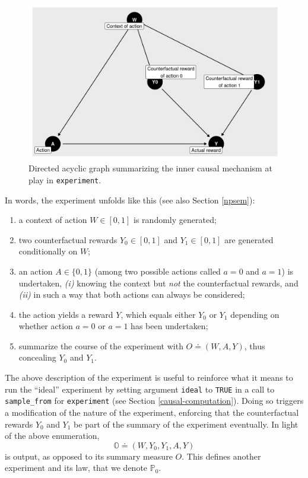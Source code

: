 \documentclass[
  11pt,
  openright,twoside]{book}
\newcommand{\bbO}{\mathbb{O}}
\newcommand{\bbP}{\mathbb{P}}
\newcommand{\defq}{\doteq}
\theoremstyle{definition}
\theoremstyle{definition}
\theoremstyle{definition}
\theoremstyle{definition}
\theoremstyle{remark}
\begin{document}
\begin{figure}

{\centering \includegraphics[width=0.7\linewidth]{img/DAG-1} 

}

\caption{Directed acyclic graph summarizing the inner causal mechanism at play in \texttt{experiment}.}\label{fig:DAG}
\end{figure}

In words, the experiment unfolds like this (see also Section \ref{npsem}):

\begin{enumerate}
\def\labelenumi{\arabic{enumi}.}
\item
  a context of action \(W \in [0,1]\) is randomly generated;
\item
  two counterfactual rewards \(Y_{0}\in [0,1]\) and \(Y_{1}\in [0,1]\) are
  generated conditionally on \(W\);
\item
  an action \(A \in \{0,1\}\) (among two possible actions called \(a=0\) and
  \(a=1\)) is undertaken, \emph{(i)} knowing the context but \emph{not} the
  counterfactual rewards, and \emph{(ii)} in such a way that both actions can
  always be considered;
\item
  the action yields a reward \(Y\), which equals either \(Y_{0}\) or \(Y_{1}\)
  depending on whether action \(a=0\) or \(a=1\) has been undertaken;
\item
  summarize the course of the experiment with \(O \defq (W, A, Y)\), thus
  concealing \(Y_{0}\) and \(Y_{1}\).
\end{enumerate}

The above description of the experiment is useful to reinforce what it means
to run the ``ideal'' experiment by setting argument \texttt{ideal} to \texttt{TRUE} in a call
to \texttt{sample\_from} for \texttt{experiment} (see Section \ref{causal-computation}).
Doing so triggers a modification of the nature of the experiment, enforcing
that the counterfactual rewards \(Y_{0}\) and \(Y_{1}\) be part of the summary of
the experiment eventually. In light of the above enumeration,
\begin{equation*}  \bbO \defq  (W,  Y_{0}, Y_{1},  A,  Y) \end{equation*} is
output, as opposed to its summary measure \(O\). This defines another
experiment and its law, that we denote \(\bbP_{0}\).
\end{document}
